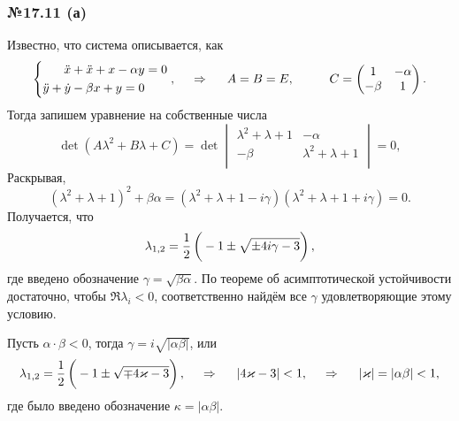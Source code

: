 


\subsubsection*{№17.11 (а)}

Известно, что система описывается, как
\begin{equation*}
    \left\{\begin{aligned}
        \ddot{x} + \ddot{x} + x - \alpha y &= 0 \\
        \ddot{y} + \dot{y} - \beta x + y = 0
    \end{aligned}\right.
    , \hspace{0.5cm} \Rightarrow \hspace{0.5cm}
    A = B = E, \hspace{1 cm}
    C = \begin{pmatrix}
        1 & -\alpha \\
        -\beta & 1 \\
    \end{pmatrix}.
\end{equation*}
Тогда запишем уравнение на собственные числа
\begin{equation*}
    \det\left(
        A \lambda^2 + B\lambda + C
    \right) = \det
    \begin{vmatrix}
        \lambda^2 + \lambda + 1 & -\alpha \\
        -\beta & \lambda^2+\lambda+1 \\
    \end{vmatrix} = 0,
\end{equation*}
Раскрывая,
\begin{equation*}
    (\lambda^2 + \lambda + 1)^2 + \beta \alpha = 
    \left(
        \lambda^2 + \lambda + 1 - i \gamma
    \right)
    \left(
        \lambda^2 + \lambda + 1 + i \gamma
    \right) = 0.
\end{equation*}
Получается, что
\begin{equation*}
    \lambda_{1, 2} = \frac{1}{2} \left(
        \vphantom{\frac{1}{2}}
        -1 \pm \sqrt{
        \pm 4 i \gamma - 3
        }
    \right),
\end{equation*}
где введено обозначение $\gamma = \sqrt{\beta \alpha}$. По теореме об асимптотической устойчивости достаточно, чтобы $\Re \lambda_i < 0$, соответственно найдём все $\gamma$ удовлетворяющие этому условию.

Пусть $\alpha \cdot \beta < 0$, тогда $\gamma = i \sqrt{|\alpha \beta|}$, или
\begin{equation*}
    \lambda_{1, 2} = \frac{1}{2}\left(
    \vphantom{\frac{1}{2}}
    -1 \pm \sqrt{\mp 4 \kappa - 3}
    \right),
    \hspace{0.5cm} \Rightarrow \hspace{0.5cm}
    |4 \kappa - 3| < 1,
    \hspace{0.5cm} \Rightarrow \hspace{0.5cm}
    |\kappa| = |\alpha \beta | < 1,
\end{equation*}
где было введено обозначение $\kappa = |\alpha \beta|$.


